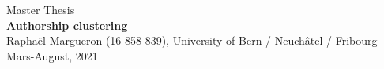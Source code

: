 \documentclass[twocolumn]{article}
\theoremstyle{definition}
\begin{document}
\date{}
\author{Raphaël Margueron}

\begin{titlepage}
\begin{center}
{\large Master Thesis}
\\[0.5cm]
{\LARGE \textbf{Authorship clustering}}
\\[0.5cm]
{\large Raphaël Margueron (16-858-839), University of Bern / Neuchâtel / Fribourg}
\\[0.5cm]
{\large Mars-August, 2021}
\\[0.5cm]
\end{center}

\tableofcontents



\end{titlepage}









\clearpage

\clearpage

\end{document}
